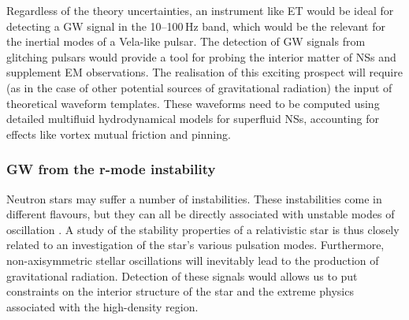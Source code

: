 Regardless of the theory uncertainties, an instrument like ET would 
be ideal for detecting a GW signal in the 10--100\,Hz band, which 
would be the relevant for the inertial modes of a Vela-like pulsar. 
The detection of GW signals from glitching pulsars would provide a 
tool for probing the interior matter of NSs and supplement EM 
observations.  The realisation of this exciting prospect will require 
(as in the case of other potential sources of gravitational radiation) 
the input of theoretical waveform templates. These waveforms need to 
be computed using detailed multifluid hydrodynamical models for 
superfluid NSs, accounting for effects like vortex mutual friction 
and pinning.

\FloatBarrier
\subsubsection{GW from the r-mode instability}


Neutron stars may suffer a number of instabilities. These instabilities 
come in different flavours, but they can all be directly associated 
with unstable modes of oscillation \cite{Andersson:2003}.
A study of the stability properties of a relativistic star is thus 
closely related to an investigation of the star's various pulsation 
modes.  Furthermore, non-axisymmetric stellar oscillations will 
inevitably lead to the production of gravitational radiation.  
Detection of these signals would allows us to  put constraints on 
the interior structure of the star and the extreme physics associated 
with the high-density region.

